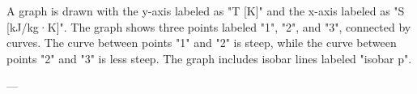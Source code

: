 A graph is drawn with the y-axis labeled as "T [K]" and the x-axis labeled as "S [kJ/kg·K]". The graph shows three points labeled "1", "2", and "3", connected by curves. The curve between points "1" and "2" is steep, while the curve between points "2" and "3" is less steep. The graph includes isobar lines labeled "isobar p".

---